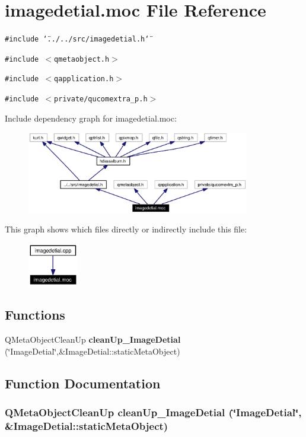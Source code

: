 \section{imagedetial.moc File Reference}
\label{imagedetial_8moc}


{\tt \#include \char`\"{}../../src/imagedetial.h\char`\"{}}\par
{\tt \#include $<$qmetaobject.h$>$}\par
{\tt \#include $<$qapplication.h$>$}\par
{\tt \#include $<$private/qucomextra\_\-p.h$>$}\par


Include dependency graph for imagedetial.moc:\begin{figure}[H]
\begin{center}
\leavevmode
\includegraphics[width=276pt]{imagedetial_8moc__incl}
\end{center}
\end{figure}


This graph shows which files directly or indirectly include this file:\begin{figure}[H]
\begin{center}
\leavevmode
\includegraphics[width=62pt]{imagedetial_8moc__dep__incl}
\end{center}
\end{figure}
\subsection*{Functions}
\begin{CompactItemize}
\item 
QMeta\-Object\-Clean\-Up {\bf clean\-Up\_\-Image\-Detial} (\char`\"{}Image\-Detial\char`\"{},\&Image\-Detial::static\-Meta\-Object)
\end{CompactItemize}


\subsection{Function Documentation}
\subsubsection{\setlength{\rightskip}{0pt plus 5cm}QMeta\-Object\-Clean\-Up clean\-Up\_\-Image\-Detial (\char`\"{}Image\-Detial\char`\"{}, \&Image\-Detial::static\-Meta\-Object)\hspace{0.3cm}{\tt  [static]}}\label{imagedetial_8moc_a0}


